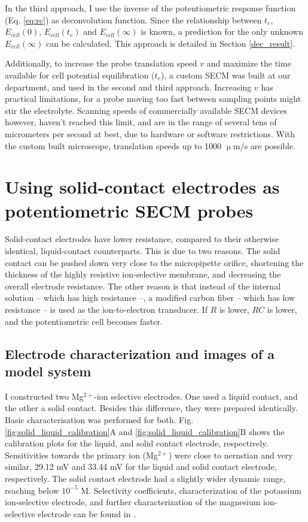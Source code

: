 In the third approach, I use the inverse of the potentiometric response function (Eq. \ref{eq:rc}) as deconvolution function.
Since the relationship between $t_e$, $E_{cell}(0)$, $E_{cell}(t_e)$ and $E_{cell}(\infty)$ is known, a prediction for the only unknown $E_{cell}(\infty)$ can be calculated.
This approach is detailed in Section \ref{dec_result}.

Additionally, to increase the probe translation speed $v$ and maximize the time available for cell potential equilibration ($t_e$), a custom SECM was built at our department, and used in the second and third approach.
Increasing $v$ has practical limitations, for a probe moving too fast between sampling points might stir the electrolyte.
Scanning speeds of commercially available SECM devices however, haven't reached this limit, and are in the range of several tens of micrometers per second at best, due to hardware or software restrictions.
With the custom built microscope, translation speeds up to 1000 $\upmu$m/s are possible.
	
	\newpage
	\section{Using solid-contact electrodes as potentiometric SECM probes}
	\label{solid_result}
Solid-contact electrodes have lower resistance, compared to their otherwise identical, liquid-contact counterparts.
This is due to two reasons.
The solid contact can be pushed down very close to the micropipette orifice, shortening the thickness of the highly resistive ion-selective membrane, and decreasing the overall electrode resistance.
The other reason is that instead of the internal solution -- which has high resistance --, a modified carbon fiber -- which has low resistance -- is used as the ion-to-electron transducer.
If $R$ is lower, $RC$ is lower, and the potentiometric cell becomes faster.


		\subsection{Electrode characterization and images of a model system}
I constructed two Mg$^{2+}$-ion selective electrodes.
One used a liquid contact, and the other a solid contact.
Besides this difference, they were prepared identically.
Basic characterisation was performed for both.
Fig. \ref{fig:solid_liquid_calibration}A and \ref{fig:solid_liquid_calibration}B shows the calibration plots for the liquid, and solid contact electrode, respectively.
Sensitivities towards the primary ion (Mg$^{2+}$) were close to nernstian and very similar, 29.12 mV and 33.44 mV for the liquid and solid contact electrode, respectively.
The solid contact electrode had a slightly wider dynamic range, reaching below $10^{-5}$ M.
Selectivity coefficients, characterization of the potassium ion-selective electrode, and further characterization of the magnesium ion-selective electrode can be found in \cite{calugareanu2013ion}.

